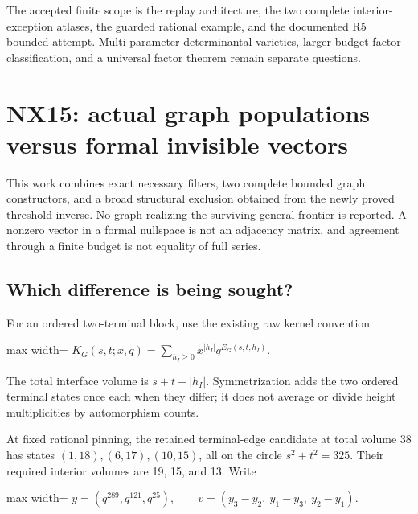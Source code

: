 \documentclass[
  11pt,
  a4paper,
]{report}
\begin{document}
The accepted finite scope is the replay architecture, the two complete
interior-exception atlases, the guarded rational example, and the
documented R5 bounded attempt. Multi-parameter determinantal varieties,
larger-budget factor classification, and a universal factor theorem
remain separate questions.

\hypertarget{nx15-actual-graph-populations-versus-formal-invisible-vectors}{%
\chapter{NX15: actual graph populations versus formal invisible
vectors}\label{nx15-actual-graph-populations-versus-formal-invisible-vectors}}

This work combines exact necessary filters, two complete bounded graph
constructors, and a broad structural exclusion obtained from the newly
proved threshold inverse. No graph realizing the surviving general
frontier is reported. A nonzero vector in a formal nullspace is not an
adjacency matrix, and agreement through a finite budget is not equality
of full series.

\hypertarget{which-difference-is-being-sought}{%
\section{Which difference is being
sought?}\label{which-difference-is-being-sought}}

For an ordered two-terminal block, use the existing raw kernel
convention

\begin{center}
\begin{adjustbox}{max width=\linewidth}
$\displaystyle
 K_G(s,t;x,q)=\sum_{h_I\ge0}x^{|h_I|}q^{E_G(s,t,h_I)}.
$
\end{adjustbox}
\end{center}

The total interface volume is \(s+t+|h_I|\). Symmetrization adds the two
ordered terminal states once each when they differ; it does not average
or divide height multiplicities by automorphism counts.

At fixed rational pinning, the retained terminal-edge candidate at total
volume 38 has states \((1,18),(6,17),(10,15)\), all on the circle
\(s^2+t^2=325\). Their required interior volumes are 19, 15, and 13.
Write

\begin{center}
\begin{adjustbox}{max width=\linewidth}
$\displaystyle
 y=(q^{289},q^{121},q^{25}),\qquad
 v=(y_3-y_2,\ y_1-y_3,\ y_2-y_1).
$
\end{adjustbox}
\end{center}
\end{document}
